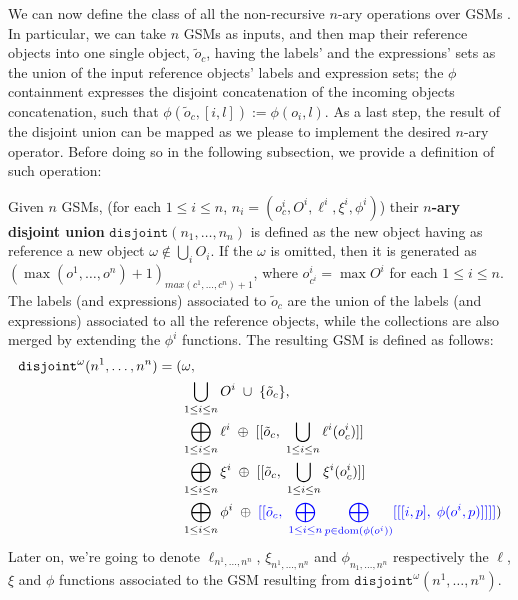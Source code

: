 We can now define the class of all the non-recursive $n$-ary operations over GSMs . In particular, we can take $n$ GSMs as inputs, and then map their reference objects into one single object, $\tilde{o}_c$, having the labels' and the expressions' sets as the union of the input reference objects' labels and expression sets; the $\phi$ containment expresses the disjoint concatenation of the incoming objects concatenation, such that $\phi(\tilde{o}_c,[i,l]):=\phi(o_i,l)$. As a last step, the result of the disjoint union can be mapped as we please to implement the desired $n$-ary operator. Before doing so in the following subsection, we provide a definition of such operation:

\begin{definition}\label{gsql:disjoint}
	Given $n$ GSMs, (for each $1\leq i\leq n$, $n_i=(o_c^i,O^i,\ell^i,\xi^i,\phi^i)$) their \textbf{$n$-ary disjoint union}  $\texttt{disjoint}(n_1,\dots,n_n)$ is defined as the new object having as reference a new object $\omega\notin \bigcup_i O_i$. If the $\omega$ is omitted, then it is generated as  $(\max(o^1,\dots,o^n)+1)_{max(c^1,\dots,c^n)+1}$, where $o^i_{c^i}=\max O^i$ for each $1\leq i\leq n$.
	 The labels (and expressions) associated to $\tilde{o}_c$ are the union of the labels (and expressions) associated to all the reference objects, while the collections are also merged by extending the $\phi^i$  functions.%
%
	The resulting GSM is defined as follows:
	\begin{alignat*}{2}
	\texttt{disjoint}^\omega(n^1,\dots,n^n)=(&\omega,\\
	&\bigcup_{1\leq i\leq n}O^i\;\cup\;\{\tilde{o}_c\},\\
	&\bigoplus_{1\leq i\leq n}\ell^i\;\oplus\;[[\tilde{o}_c,\; \bigcup_{1\leq i\leq n}\ell^i(o_c^i)]]\\
	&\bigoplus_{1\leq i\leq n}\xi^i\;\oplus\;[[\tilde{o}_c,\; \bigcup_{1\leq i\leq n}\xi^i(o_c^i)]]\\
	&\bigoplus_{1\leq i\leq n}\phi^i\;\oplus\; {\color{blue}[[\tilde{o}_c,\; \bigoplus_{1\leq i\leq n}\bigoplus_{p\in\operatorname{dom}(\phi(o^i))}[[[i,p],\; \phi(o^i,p)]]]]})\\
	\end{alignat*}
Later on, we're going to denote $\ell_{n^1,\dots,n^n}$, $\xi_{n^1,\dots,n^n}$ and $\phi_{n_1,\dots,n^n}$ respectively the $\ell$, $\xi$ and $\phi$ functions associated to the GSM resulting from $\texttt{disjoint}^\omega(n^1,\dots,n^n)$.
\end{definition}



